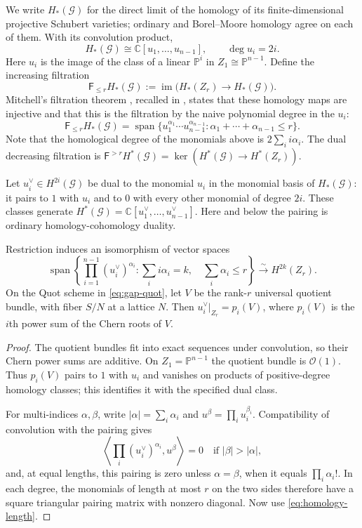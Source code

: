 \documentclass[a4paper,11pt,leqno]{amsart}
\newcommand{\C}{\mathbb C}\newcommand{\J}{\mathcal J}
\newcommand{\Span}{\operatorname{span}}
\begin{document}
We write $H_*(\mathcal G)$ for the direct limit of the homology of
its finite-dimensional projective Schubert varieties; ordinary and
Borel--Moore homology agree on each of them. With its convolution product,
\[
 H_*(\mathcal G)\cong \C[u_1,\ldots,u_{n-1}],\qquad \deg u_i=2i.
\]
Here $u_i$ is the image of the class of a linear $\mathbb P^i$ in
$Z_1\cong\mathbb P^{n-1}$. Define the increasing filtration
\[
 \mathsf{F}_{\le r}H_*(\mathcal G)
 :=\operatorname{im}\bigl(H_*(Z_r)\longrightarrow H_*(\mathcal G)\bigr).
\]
Mitchell's filtration theorem \cite{Mitchell}, recalled in
\cite[\S1 and \S11]{BM}, states that these homology maps are injective
and that this is the filtration by the naive polynomial degree in the $u_i$:
\begin{equation}\label{eq:homology-length}
 \mathsf{F}_{\le r}H_*(\mathcal G)
 =\Span\{u_1^{\alpha_1}\cdots u_{n-1}^{\alpha_{n-1}}:
                 \alpha_1+\cdots+\alpha_{n-1}\le r\}.
\end{equation}
Note that the
homological degree of the monomials above is $2\sum_i i\alpha_i$. The dual decreasing
filtration is
$\mathsf{F}^{>r}H^*(\mathcal G)=\ker(H^*(\mathcal G)\to H^*(Z_r))$.

Let $u_i^\vee\in H^{2i}(\mathcal G)$ be dual to the monomial $u_i$
in the monomial basis of $H_*(\mathcal G)$: it pairs to $1$ with $u_i$
and to $0$ with every other monomial of degree $2i$. These classes
generate $H^*(\mathcal G)=\C[u_1^\vee,\ldots,u_{n-1}^\vee]$.
Here and below the pairing is ordinary homology-cohomology duality.

\begin{lem}\label{lem:bott}
Restriction induces an isomorphism of vector spaces
\[
 \Span\left\{\prod_{i=1}^{n-1}(u_i^\vee)^{\alpha_i}:
       \sum_i i\alpha_i=k,\quad\sum_i\alpha_i\le r\right\}
 \xrightarrow{\sim}H^{2k}(Z_r).
\]
On the Quot scheme in \eqref{eq:gap-quot}, let $V$ be the rank-$r$
universal quotient bundle, with fiber $S/N$ at a lattice $N$.
Then $u_i^\vee|_{Z_r}=p_i(V)$, where $p_i(V)$ is the $i$th power
sum of the Chern roots of $V$.
\end{lem}
\begin{proof}
The quotient bundles fit into exact sequences under convolution, so
their Chern power sums are additive. On $Z_1=\mathbb P^{n-1}$ the
quotient bundle is $\mathcal O(1)$. Thus $p_i(V)$ pairs to $1$ with
$u_i$ and vanishes on products of positive-degree homology classes;
this identifies it with the specified dual class.

For multi-indices $\alpha,\beta$, write $|\alpha|=\sum_i\alpha_i$
and $u^\beta=\prod_i u_i^{\beta_i}$. Compatibility of convolution
with the pairing gives
\[
 \left\langle\prod_i(u_i^\vee)^{\alpha_i},u^\beta\right\rangle=0
       \quad\text{if }|\beta|>|\alpha|,
\]
and, at equal lengths, this pairing is zero unless $\alpha=\beta$,
when it equals $\prod_i\alpha_i!$. In each degree, the monomials
of length at most $r$ on the two sides therefore have a square
triangular pairing matrix with nonzero diagonal. Now use
\eqref{eq:homology-length}.
\end{proof}
\end{document}
